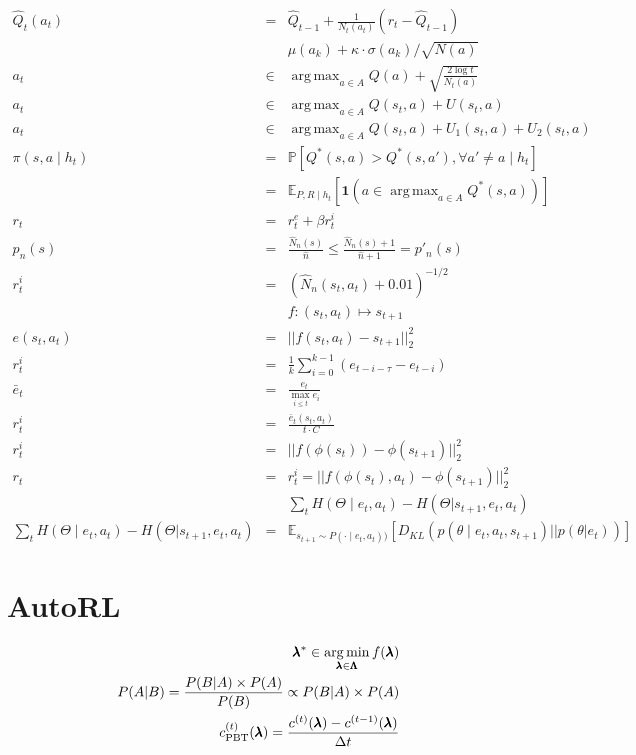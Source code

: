 \documentclass[]{article}
\DeclareMathOperator*{\argmax}{arg\,max}
\DeclareMathOperator*{\argmin}{arg\,min}
\begin{document}
\begin{eqnarray}
    \hat{Q}_t(a_t) &=& \hat{Q}_{t-1} + \frac{1}{N_t(a_t)} (r_t - \hat{Q}_{t-1})\\
    &&\mu(a_k) + \kappa \cdot \sigma(a_k) / \sqrt{N(a)}\\
    a_t &\in& \argmax_{a \in A} Q(a) + \sqrt{\frac{2\log t }{N_t(a)}}\\
    a_t &\in& \argmax_{a \in A} Q(s_t, a) + U(s_t, a) \\
    a_t &\in& \argmax_{a \in A} Q(s_t, a) + U_1(s_t, a) + U_2(s_t, a)\\
    \pi(s, a \mid h_t) &=& \mathbb{P} [Q^*(s,a) > Q^*(s,a'), \forall a' \neq a \mid h_t] \\
    &=& \mathbb{E}_{P, R \mid h_t} \left[\mathbf{1}(a \in \argmax_{a \in A} Q^*(s,a))\right]\\
    r_t &=& r^e_t + \beta r_t^i\\
    p_n(s) &=&  \frac{\hat{N}_n(s)}{\hat{n}} \leq \frac{\hat{N}_n(s) + 1}{\hat{n} + 1} = p'_n(s)\\
    r_t^i &=& (\hat{N}_n (s_t, a_t) + 0.01)^{-1/2} \\
    && f: (s_t, a_t) \mapsto s_{t+1} \\
    e(s_t, a_t) &=& || f(s_t, a_t) - s_{t+1}||_2^2\\
    r_t^i &=& \frac{1}{k} \sum_{i=0}^{k-1} (e_{t-i-\tau} - e_{t-i})\\
    \bar{e}_t &=& \frac{e_t}{\max_{i \leq t} e_i} \\
    r_t^i &=& \frac{\bar{e}_t(s_t, a_t)}{t \cdot C}\\
    r_t^i &=& || f(\phi(s_{t})) - \phi(s_{t+1})||^2_2\\
    r_t  &=& r_t^i = ||f(\phi(s_t), a_t) - \phi(s_{t+1}) ||_2^2\\
    &&\sum_t H(\Theta \mid e_t, a_t) - H(\Theta | s_{t+1}, e_t, a_t)\\
    \sum_t H(\Theta \mid e_t, a_t) - H(\Theta | s_{t+1}, e_t, a_t) &=& \mathbb{E}_{s_{t+1}\sim P(\cdot\mid e_t, a_t))} \left[ D_{KL} (p(\theta \mid e_t, a_t, s_{t+1}) || p(\theta|e_t))  \right]
\end{eqnarray}



\section{AutoRL}

\begin{eqnarray}
   \conf^* \in \argmin_{\conf \in \confs} f(\conf)\\
   P(A \vert B) = \frac{P(B \vert A) \times  P(A)}{P(B)} \propto P(B \vert A) \times  P(A)\\
   \cost_{\text{PBT}}^{(t)}(\conf)= \frac{\cost^{(t)}(\conf) - \cost^{(t-1)}(\conf)}{\Delta t}
\end{eqnarray}
\end{document}
